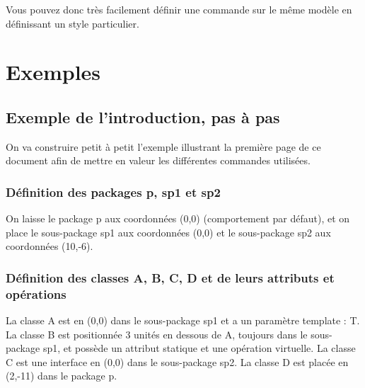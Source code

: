 \documentclass[a4paper,11pt]{report}
\newcommand{\inputTikZ}[1]{%
  }%
\newcommand{\inputTikZ}[1]{%
    \texttt{[image: fig/\#1.pdf]}%
  }%
\begin{document}
Vous pouvez donc très facilement définir une commande sur le même modèle en définissant un style particulier.

\section{Exemples}

\subsection{Exemple de l'introduction, pas à pas}

On va construire petit à petit l'exemple illustrant la première page de ce document afin de mettre en valeur les différentes commandes utilisées.

\subsubsection{Définition des packages p, sp1 et sp2}

On laisse le package p aux coordonnées (0,0) (comportement par défaut), et on place le sous-package sp1 aux coordonnées (0,0) et le sous-package sp2 aux coordonnées (10,-6).

{\color{red!70!black}
\vspace{-0.4cm}
\vspace{-0.4cm}
\vspace{-0.4cm}

}

\begin{center}
\inputTikZ{classdiagstep1}
\end{center}

\subsubsection{Définition des classes A, B, C, D et de leurs attributs et opérations}

La classe A est en (0,0) dans le sous-package sp1 et a un paramètre template : T. La classe B est positionnée 3 unités en dessous de A, toujours dans le sous-package sp1, et  possède un attribut statique et une opération virtuelle. La classe C est une interface en (0,0) dans le sous-package sp2. La classe D est placée en (2,-11) dans le package p.
\end{document}
